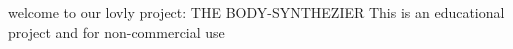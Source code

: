 \label{index_md_mainpage}%
%
welcome to our lovly project\+: THE BODY-\/\+SYNTHEZIER This is an educational project and for non-\/commercial use  